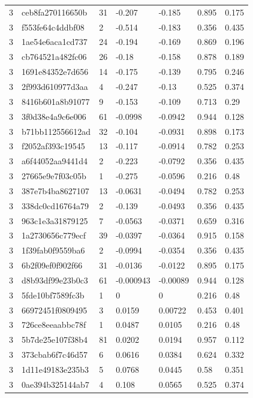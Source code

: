 \begin{tabular}{lllllll}
3 & ceb8fa270116650b & 31 & -0.207 & -0.185 & 0.895 & 0.175 \\
3 & f553fe64c4ddbf08 & 2 & -0.514 & -0.183 & 0.356 & 0.435 \\
3 & 1ae54e6aca1cd737 & 24 & -0.194 & -0.169 & 0.869 & 0.196 \\
3 & cb764521a482fc06 & 26 & -0.18 & -0.158 & 0.878 & 0.189 \\
3 & 1691e84352e7d656 & 14 & -0.175 & -0.139 & 0.795 & 0.246 \\
3 & 2f993d610977d3aa & 4 & -0.247 & -0.13 & 0.525 & 0.374 \\
3 & 8416b601a8b91077 & 9 & -0.153 & -0.109 & 0.713 & 0.29 \\
3 & 3f0d38e4a9c6e006 & 61 & -0.0998 & -0.0942 & 0.944 & 0.128 \\
3 & b71bb112556612ad & 32 & -0.104 & -0.0931 & 0.898 & 0.173 \\
3 & f2052af393c19545 & 13 & -0.117 & -0.0914 & 0.782 & 0.253 \\
3 & a6f44052aa9441d4 & 2 & -0.223 & -0.0792 & 0.356 & 0.435 \\
3 & 27665e9e7f03c05b & 1 & -0.275 & -0.0596 & 0.216 & 0.48 \\
3 & 387e7b4ba8627107 & 13 & -0.0631 & -0.0494 & 0.782 & 0.253 \\
3 & 338dc0cd16764a79 & 2 & -0.139 & -0.0493 & 0.356 & 0.435 \\
3 & 963c1e3a31879125 & 7 & -0.0563 & -0.0371 & 0.659 & 0.316 \\
3 & 1a2730656c779ecf & 39 & -0.0397 & -0.0364 & 0.915 & 0.158 \\
3 & 1f39fab0f9559ba6 & 2 & -0.0994 & -0.0354 & 0.356 & 0.435 \\
3 & 6b2f09ef0f902f66 & 31 & -0.0136 & -0.0122 & 0.895 & 0.175 \\
3 & d8b93df99e23b0c3 & 61 & -0.000943 & -0.00089 & 0.944 & 0.128 \\
3 & 5fde10bf7589fc3b & 1 & 0 & 0 & 0.216 & 0.48 \\
3 & 66972451f0809495 & 3 & 0.0159 & 0.00722 & 0.453 & 0.401 \\
3 & 726ce8eeaabbc78f & 1 & 0.0487 & 0.0105 & 0.216 & 0.48 \\
3 & 5b7de25e107f38b4 & 81 & 0.0202 & 0.0194 & 0.957 & 0.112 \\
3 & 373cbab6f7c46d57 & 6 & 0.0616 & 0.0384 & 0.624 & 0.332 \\
3 & 1d11e49183e235b3 & 5 & 0.0768 & 0.0445 & 0.58 & 0.351 \\
3 & 0ae394b325144ab7 & 4 & 0.108 & 0.0565 & 0.525 & 0.374 \\

\end{tabular}
